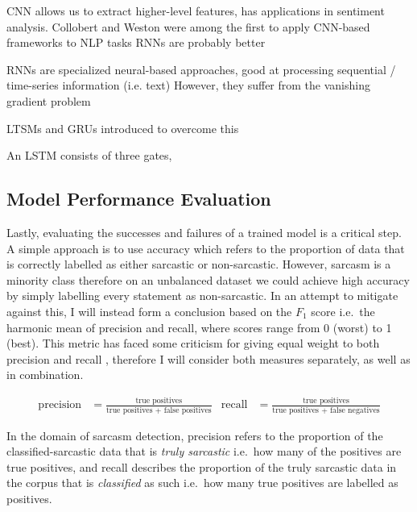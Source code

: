 \documentclass[12pt,a4paper]{article}
\begin{document}
CNN allows us to extract higher-level features, has applications in sentiment analysis. Collobert and Weston were among the first to apply CNN-based frameworks to NLP tasks
RNNs are probably better

RNNs are specialized neural-based approaches, good at processing sequential / time-series information (i.e. text)
However, they suffer from the vanishing gradient problem

LTSMs and GRUs introduced to overcome this

An LSTM consists of three gates, 




\newpage


\subsection{Model Performance Evaluation}
\noindent Lastly, evaluating the successes and failures of a trained model is a critical step. A simple approach is to use accuracy which refers to the proportion of data that is correctly labelled as either sarcastic or non-sarcastic. However, sarcasm is a minority class therefore on an unbalanced dataset we could achieve high accuracy by simply labelling every statement as non-sarcastic. In an attempt to mitigate against this, I will instead form a conclusion based on the $F_{1}$ score i.e.\ the harmonic mean of precision and recall, where scores range from 0 (worst) to 1 (best). This metric has faced some criticism for giving equal weight to both precision and recall \cite{hand2018note}, therefore I will consider both measures separately, as well as in combination.

\begin{align*}
\mbox{precision} &= \frac{\mbox{true positives}}{\mbox{true positives + false positives}}   &  \mbox{recall} &= \frac{\mbox{true positives}}{\mbox{true positives + false negatives}}
\end{align*}

\noindent In the domain of sarcasm detection, precision refers to the proportion of the classified-sarcastic data that is \textit{truly sarcastic} i.e.\ how many of the positives are true positives, and recall describes the proportion of the truly sarcastic data in the corpus that is \textit{classified} as such i.e.\ how many true positives are labelled as positives. \\


\hrulefill


\end{document}
